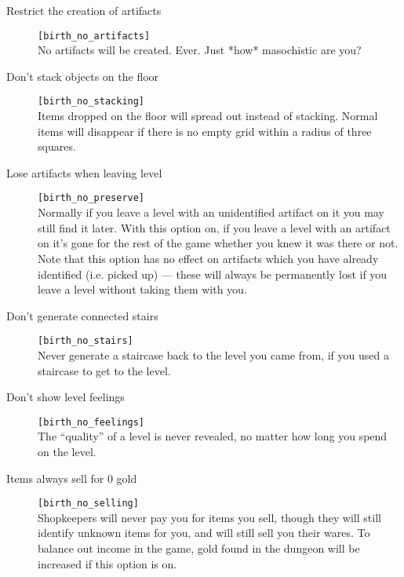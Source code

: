 \begin{description}
 \item[Restrict the creation of artifacts]
 \verb+[birth_no_artifacts]+\\
     No artifacts will be created. Ever. Just *how* masochistic are you?

\item[Don't stack objects on the floor] \verb+[birth_no_stacking]+\\
     Items dropped on the floor will spread out instead of stacking.
     Normal items will disappear if there is no empty grid within a radius
     of three squares.

\item[Lose artifacts when leaving level] \verb+[birth_no_preserve]+\\
     Normally if you leave a level with an unidentified artifact on it
     you may still find it later. With this option on, if you leave a level
     with an artifact on it's gone for the rest of the game whether you
     knew it was there or not. Note that this option has no effect on
     artifacts which you have already identified (i.e. picked up) --- these
     will always be permanently lost if you leave a level without taking
     them with you.

\item[Don't generate connected stairs] \verb+[birth_no_stairs]+\\
     Never generate a staircase back to the level you came from, if you used
     a staircase to get to the level.

\item[Don't show level feelings] \verb+[birth_no_feelings]+\\
     The ``quality'' of a level is never revealed, no matter how long you
     spend on the level.

\item[Items always sell for 0 gold] \verb+[birth_no_selling]+\\
     Shopkeepers will never pay you for items you sell, though they will
     still identify unknown items for you, and will still sell you their
     wares. To balance out income in the game, gold found in the dungeon
     will be increased if this option is on.
\end{description}

